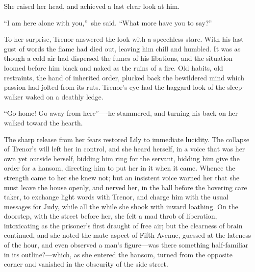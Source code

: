 \documentclass[12pt,a4paper]{book}
\begin{document}
She raised her head, and achieved a last clear look at him.





``I am here alone with you,''\ she said. ``What more have you to
say?''





To her surprise, Trenor answered the look with a speechless
stare. With his last gust of words the flame had died out,
leaving him chill and humbled. It was as though a cold air had
dispersed the fumes of his libations, and the situation loomed
before him black and naked as the ruins of a fire. Old habits,
old restraints, the hand of inherited order, plucked back the
bewildered mind which passion had jolted from its ruts. Trenor's
eye had the haggard look of the sleep-walker waked on a deathly
ledge.





``Go home! Go away from here''----he stammered, and turning his back
on her walked toward the hearth.





The sharp release from her fears restored Lily to immediate
lucidity. The collapse of Trenor's will left her in control, and
she heard herself, in a voice that was her own yet outside
herself, bidding him ring for the servant, bidding him give the
order for a hansom, directing him to put her in it when
it came. Whence the strength came to her she knew not; but an
insistent voice warned her that she must leave the house openly,
and nerved her, in the hall before the hovering care taker, to
exchange light words with Trenor, and charge him with the usual
messages for Judy, while all the while she shook with inward
loathing. On the doorstep, with the street before her, she felt a
mad throb of liberation, intoxicating as the prisoner's first
draught of free air; but the clearness of brain continued, and
she noted the mute aspect of Fifth Avenue, guessed at the
lateness of the hour, and even observed a man's figure---was there
something half-familiar in its outline?---which, as she entered
the hansom, turned from the opposite corner and vanished in the
obscurity of the side street.
\end{document}
